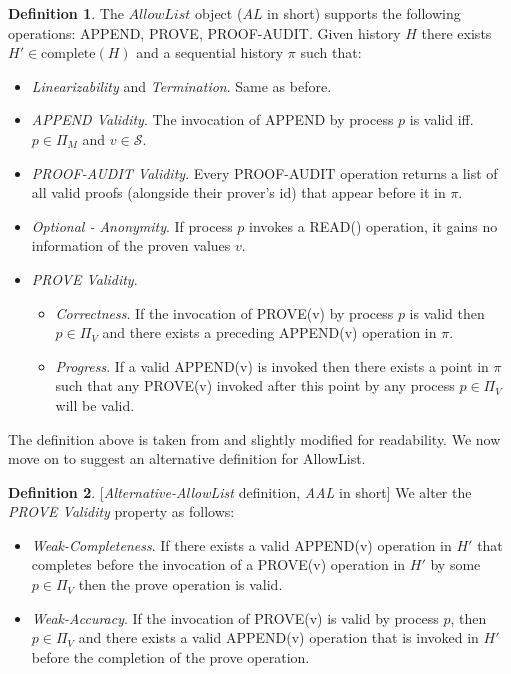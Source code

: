 \documentclass[11pt]{article}
\theoremstyle{definition}
\newtheorem{definition}{Definition}
\begin{document}
\begin{definition}
The $AllowList$ object ($AL$ in short) supports the following operations: \mbox{APPEND}, \mbox{PROVE}, \mbox{PROOF-AUDIT}. Given history $H$ there exists $H'\in \mbox{complete}(H)$ and a sequential history $\pi$ such that:
\begin{itemize}
\item \textit{Linearizability} and \textit{Termination}. Same as before.
  \item \textit{\mbox{APPEND} Validity}. The invocation of \mbox{APPEND} by process $p$ is valid iff. $p\in \Pi_M$ and $v \in \mathcal{S}$.
  \item \textit{PROOF-AUDIT Validity}. Every PROOF-AUDIT operation returns a list of all valid proofs (alongside their prover's id) that appear before it in $\pi$.
  \item \textit{Optional - Anonymity}. If process $p$ invokes a READ() operation, it gains no information of the proven values $v$.
  \item \textit{\mbox{PROVE} Validity}.
  \begin{itemize}
   \item \textit{Correctness}.  If the invocation of \mbox{PROVE}(v) by process $p$ is valid then $p\in \Pi_V$ and there exists a preceding APPEND(v) operation in $\pi$.
  \item \textit{Progress}. If a valid APPEND(v) is invoked then there exists a point in $\pi$ such that any PROVE(v) invoked after this point by any process $p\in \Pi_V$ will be valid.
  \end{itemize}
\end{itemize}

\end{definition}

The definition above is taken from \cite{AccessControl} and slightly modified for readability. We now move on to suggest an alternative definition for AllowList. 

\begin{definition}\label{def:AAL}[\textit{Alternative-AllowList} definition, \textit{AAL} in short]
We alter the \textit{\mbox{PROVE} Validity} property as follows:
\begin{itemize}
   \item \textit{Weak-Completeness}. If there exists a valid \mbox{APPEND}(v) operation in $H'$ that completes before the invocation of a \mbox{PROVE}(v) operation in $H'$ by some $p\in \Pi_V$ then the prove operation is valid. 
  \item \textit{Weak-Accuracy}. If the invocation of PROVE(v) is valid by process $p$, then $p \in \Pi_V$ and there exists a valid \mbox{APPEND}(v) operation that is invoked in $H'$ 
 before the completion of the prove operation.
\end{itemize}
\end{definition}
\end{document}
